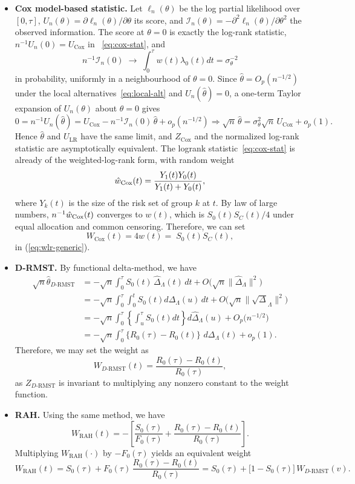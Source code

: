 \documentclass[12pt]{article}
\newcommand{\RAH}{\mathrm{RAH}}
\newcommand{\DRMST}{D\text{-}\mathrm{RMST}}
\newcommand{\dd}{\,d}
\begin{document}
\begin{itemize}
\item \textbf{Cox model-based statistic.}
  Let
\(\ell_n(\theta)\) be the log partial likelihood over \([0, \tau]\),
\(U_n(\theta)=\partial\ell_n(\theta)/\partial\theta\) its score, and
\(\mathcal I_n(\theta)=-\partial^2\ell_n(\theta)/\partial\theta^2\) the
observed information.  The score at \(\theta=0\) is exactly the log-rank
statistic, \(n^{-1}U_n(0)=U_{\mathrm{Cox}}\) in ~\eqref{eq:cox-stat}, and
\[
  n^{-1}\mathcal I_n(0)
    \;\longrightarrow\;
  \int_0^{\tau}w(t)\lambda_0(t)dt=\sigma_\theta^{-2}
\]
in probability, uniformly in a neighbourhood of \(\theta=0\).  Since
\(\hat\theta=O_p(n^{-1/2})\) under the local
alternatives~\eqref{eq:local-alt} and \(U_n(\hat\theta)=0\), a one-term
Taylor expansion of \(U_n(\theta)\) about \(\theta=0\) gives
\[
  0=n^{-1}U_n(\hat\theta)
   =U_{\mathrm{Cox}}-n^{-1}\mathcal I_n(0)\,\hat\theta+o_p(n^{-1/2})
  \Rightarrow
  \sqrt n\,\hat\theta=\sigma_\theta^{2}\sqrt n\,U_{\mathrm{Cox}}+o_p(1).
\]
Hence \(\hat\theta\) and \(U_{\mathrm{LR}}\) have the same
limit, and \(Z_{\mathrm{Cox}}\) and the normalized log-rank statistic are
asymptotically equivalent.  The logrank statistic~\eqref{eq:cox-stat} is
already of the weighted-log-rank form, with random weight
\[
 \hat{w}_{\rm{Cox}}(t)=\frac{Y_1(t)Y_0(t)}{Y_1(t)+Y_0(t)},
\]
where $Y_k(t)$ is the size of the risk set of group $k$ at $t.$  By law of large numbers, $n^{-1}\hat{w}_{\rm{Cox}}(t)$ converges to \(w(t)\), which is $S_0(t)S_C(t)/4$ under equal
allocation and common censoring. Therefore, we can set
\[
  W_{\mathrm{Cox}}(t)=4w(t)=\;S_0(t)S_C(t),
\]
in (\ref{eq:wlr-generic}).


\item \textbf{D-RMST.}
By functional delta-method, we have
\begin{align*}
  \sqrt{n}\hat\theta_{\DRMST}&=-\sqrt{n}\int_0^\tau S_0(t)\,\hat{\Delta}_\Lambda(t)\dd t+O\bigl(\sqrt{n}\|\hat{\Delta}_\Lambda\|^2\bigr)\\
  &=-\sqrt{n}\int_0^\tau \int_0^t S_0(t) d\Delta_\Lambda(u)\dd t+O\bigl(\sqrt{n}\|\sqrt{\Delta}_\Lambda\|^2\bigr)\\
  &=-\sqrt{n}\int_0^\tau\left\{\int_u^\tau S_0(t)dt\right\}d\hat{\Delta}_\Lambda(u)+O_p\bigl(n^{-1/2}\bigr)\\
  &=-\sqrt{n}\int_0^\tau\{R_0(\tau)-R_0(t)\}\,\dd\Delta_\Lambda(t)+o_p(1).
\end{align*}
Therefore, we may set the weight as
\[
  W_{\DRMST}(t)=\frac{R_0(\tau)-R_0(t)}{R_0(\tau)},
\]
as $Z_{\DRMST}$ is invariant to multiplying any nonzero constant to the weight function.


\item \textbf{RAH.}
Using the same method, we have
\[
  W_{\RAH}(t)=-\left[\frac{S_0(\tau)}{F_0(\tau)}+\frac{R_0(\tau)-R_0(t)}{R_0(\tau)}\right].
\]
Multiplying
$W_{\RAH}(\cdot)$ by $-F_0(\tau)$ yields an equivalent weight
\[
  W_{\RAH}(t)
    =S_0(\tau)+F_0(\tau)\,\frac{R_0(\tau)-R_0(t)}{R_0(\tau)}
    =S_0(\tau)+\bigl[1-S_0(\tau)\bigr]\, W_{\DRMST}(v).
\]
\end{itemize}
\end{document}
